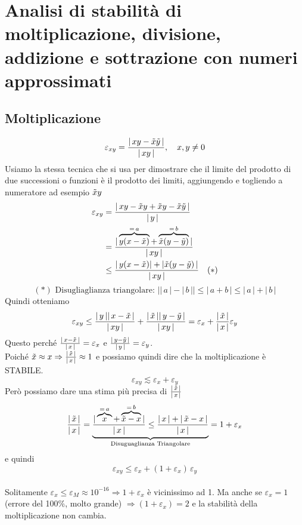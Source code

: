 \section{Analisi di stabilità di moltiplicazione, divisione,	addizione e sottrazione con numeri approssimati}
\subsection{Moltiplicazione}
\[ \varepsilon_{xy} = \frac{\lvert \, xy - \Tilde{x}\Tilde{y} \, \rvert}{\lvert \, xy \, \rvert}, \quad x , y \ne 0 \]
Usiamo la stessa tecnica che si usa per dimostrare che il limite del prodotto di due successioni o funzioni è il prodotto dei limiti, aggiungendo e togliendo a numeratore ad esempio $\Tilde{x}y$
\[\begin{split}
\varepsilon_{xy} & = \frac{\lvert \, xy - \Tilde{x}y + \Tilde{x}y - \Tilde{x}\Tilde{y} \, \rvert}{\lvert \, y \, \rvert} \\
& = \frac{\lvert \, \overbrace{y(x - \Tilde{x})}^{=\,a} + \overbrace{\Tilde{x}(y - \Tilde{y})}^{=\,b} \, \rvert}{\lvert\, xy \, \rvert} \\
& \le \frac{\lvert \, y(x - \Tilde{x}) \rvert + \lvert \Tilde{x}(y - \Tilde{y}) \, \rvert}{\lvert \, xy \, \rvert} \quad (*)
\end{split}\]
\[(*)\text{ Disugliaglianza triangolare: } \lvert \lvert \, a \, \rvert - \lvert \, b \, \rvert \rvert \le \lvert \, a + b \, \rvert \le \lvert \, a \, \rvert + \lvert \, b \, \rvert\]
Quindi otteniamo
\[ \varepsilon_{xy} \le \frac{\lvert \,y\, \rvert \lvert \,x - \Tilde{x}\, \rvert}{\lvert \,xy\, \rvert} + \frac{\lvert \,\Tilde{x}\, \rvert \lvert \,y - \Tilde{y}\, \rvert}{\lvert \,xy\, \rvert} = \varepsilon_x + \frac{\lvert \,\Tilde{x}\, \rvert}{\lvert \,x\, \rvert} \varepsilon_y\]
Questo perché $\frac{\lvert \,x - \Tilde{x}\, \rvert}{\lvert \,x\, \rvert} = \varepsilon_x$ e $\frac{\lvert \,y - \Tilde{y}\, \rvert}{\lvert \,y\, \rvert} = \varepsilon_y$.\\
Poiché $\Tilde{x} \approx x \Rightarrow \frac{\lvert \,\Tilde{x}\, \rvert}{\lvert \,x\, \rvert} \approx 1$ e possiamo quindi dire che la moltiplicazione è STABILE. 
\[\varepsilon_{xy} \lesssim \varepsilon_x + \varepsilon_y \]
Però possiamo dare una stima più precisa di  $\frac{\lvert \,\Tilde{x}\, \rvert}{\lvert \,x\, \rvert}$
\[ \frac{\lvert \,\Tilde{x}\, \rvert}{\lvert \,x\, \rvert} = \underbrace{ \frac{\lvert \, \overbrace{x}^{=\,a} + \overbrace{\Tilde{x} - x}^{=\,b} \, \rvert}{\lvert\, x \, \rvert} \le \frac{\lvert \, x \, \rvert + \lvert \,\Tilde{x} - x\, \rvert}{\lvert\, x \, \rvert}}_{\text{Disuguaglianza Triangolare}} = 1 + \varepsilon_x\]
e quindi \[ \varepsilon_{xy} \le \varepsilon_x + (1 + \varepsilon_x)\,\varepsilon_y\]\\
Solitamente $\varepsilon_x \le \varepsilon_M \approx 10^{-16} \Rightarrow 1 + \varepsilon_x$ è vicinissimo ad 1.
Ma anche se $\varepsilon_x = 1$ (errore del 100\%, molto grande) $\Rightarrow (1+\varepsilon_x)=2$ e la stabilità della moltiplicazione non cambia.
